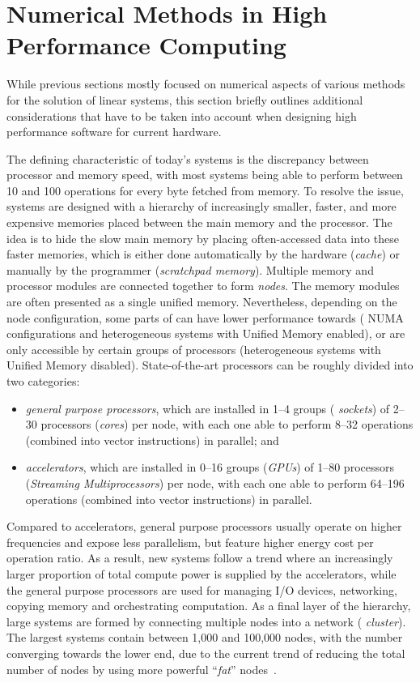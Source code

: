 \section{Numerical Methods in High Performance Computing}

While previous sections mostly focused on numerical aspects of various methods
for the solution of linear systems, this section briefly outlines additional
considerations that have to be taken into account when designing high
performance software for current hardware.

The defining characteristic of today's systems is the discrepancy between
processor and memory speed, with most systems being able to perform between 10
and 100 operations for every byte fetched from memory. To resolve the issue,
systems are designed with a hierarchy of increasingly smaller, faster, and more
expensive memories placed between the main memory and the processor. The idea is
to hide the slow main memory by placing often-accessed data into these faster
memories, which is either done automatically by the hardware (\emph{cache}) or
manually by the programmer (\emph{scratchpad memory}). Multiple memory and
processor modules are connected together to form \emph{nodes}. The memory
modules are often presented as a single unified memory. Nevertheless, depending
on the node configuration, some parts of can have lower performance towards (\eg
NUMA configurations and heterogeneous systems with
Unified Memory enabled), or are only accessible by certain groups of processors
(\eg heterogeneous systems with Unified Memory disabled). State-of-the-art
processors can be roughly divided into two categories:
\begin{itemize}
\item \emph{general purpose processors}, which are installed in 1--4 groups (\ie
\emph{sockets}) of 2--30 processors (\ie \emph{cores}) per node, with each one
able to perform 8--32 operations (combined into vector instructions) in
parallel; and
\item \emph{accelerators}, which are installed in 0--16 groups (\eg \emph{GPUs})
of 1--80 processors (\eg \emph{Streaming Multiprocessors}) per node, with each
one able to perform 64--196 operations (combined into vector instructions) in
parallel.
\end{itemize}
Compared to accelerators, general purpose processors usually operate on higher
frequencies and expose less parallelism, but feature higher energy cost per
operation ratio. As a result, new systems follow a trend where an increasingly
larger proportion of total compute power is supplied by the accelerators, while
the general purpose processors are used for managing I/O devices, networking,
copying memory and orchestrating computation. As a final layer of the hierarchy,
large systems are formed by connecting multiple nodes into a network (\ie
\emph{cluster}). The largest systems contain between 1,000 and 100,000 nodes,
with the number converging towards the lower end, due to the current trend of
reducing the total number of nodes by using more powerful ``\emph{fat}''
nodes~\cite{top500}.

